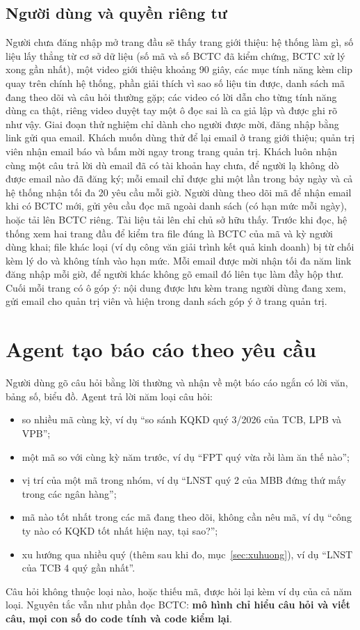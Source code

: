 \documentclass[12pt,a4paper]{report}
\newcommand{\enquote}[1]{“#1”}
\begin{document}
\subsection{Người dùng và quyền riêng tư}
Người chưa đăng nhập mở trang đầu sẽ thấy trang giới thiệu: hệ thống làm gì, số liệu lấy thẳng từ cơ sở dữ liệu (số mã
và số BCTC đã kiểm chứng, BCTC xử lý xong gần nhất), một video giới thiệu khoảng 90 giây, các mục tính năng kèm clip quay trên
chính hệ thống, phần giải thích vì sao số liệu tin được, danh sách mã đang theo dõi và câu hỏi thường gặp; các video có
lời dẫn cho từng tính năng dùng ca thật, riêng video duyệt tay một ô đọc sai là ca giả lập và được ghi rõ như vậy. Giai đoạn thử nghiệm chỉ dành cho người được mời, đăng nhập bằng link gửi qua email. Khách muốn
dùng thử để lại email ở trang giới thiệu; quản trị viên nhận email báo và bấm mời ngay trong trang quản trị. Khách luôn
nhận cùng một câu trả lời dù email đã có tài khoản hay chưa, để người lạ không dò được email nào đã đăng ký; mỗi email chỉ
được ghi một lần trong bảy ngày và cả hệ thống nhận tối đa 20 yêu cầu mỗi giờ. Người dùng theo dõi mã để nhận
email khi có BCTC mới, gửi yêu cầu đọc mã ngoài danh sách (có hạn mức mỗi ngày), hoặc tải lên BCTC riêng. Tài liệu tải
lên chỉ chủ sở hữu thấy. Trước khi đọc, hệ thống xem hai trang đầu để kiểm tra file đúng là BCTC của mã và kỳ người dùng
khai; file khác loại (ví dụ công văn giải trình kết quả kinh doanh) bị từ chối kèm lý do và không tính vào hạn mức.
Mỗi email được mời nhận tối đa năm link đăng nhập mỗi giờ, để người khác không gõ email đó liên tục làm đầy hộp thư.
Cuối mỗi trang có ô góp ý: nội dung được lưu kèm trang người dùng đang xem, gửi email cho quản trị viên và hiện trong
danh sách góp ý ở trang quản trị.

\section{Agent tạo báo cáo theo yêu cầu}\label{sec:agent}
Người dùng gõ câu hỏi bằng lời thường và nhận về một báo cáo ngắn có lời văn, bảng số, biểu đồ. Agent trả lời năm loại
câu hỏi:
\begin{itemize}
  \item so nhiều mã cùng kỳ, ví dụ \enquote{so sánh KQKD quý 3/2026 của TCB, LPB và VPB};
  \item một mã so với cùng kỳ năm trước, ví dụ \enquote{FPT quý vừa rồi làm ăn thế nào};
  \item vị trí của một mã trong nhóm, ví dụ \enquote{LNST quý 2 của MBB đứng thứ mấy trong các ngân hàng};
  \item mã nào tốt nhất trong các mã đang theo dõi, không cần nêu mã, ví dụ \enquote{công ty nào có KQKD tốt nhất hiện
        nay, tại sao?};
  \item xu hướng qua nhiều quý (thêm sau khi đo, mục~\ref{sec:xuhuong}), ví dụ \enquote{LNST của TCB 4 quý gần nhất}.
\end{itemize}
Câu hỏi không thuộc loại nào, hoặc thiếu mã, được hỏi lại kèm ví dụ của cả năm loại. Nguyên tắc vẫn như phần đọc BCTC:
\textbf{mô hình chỉ hiểu câu hỏi và viết câu, mọi con số do code tính và code kiểm lại}.
\end{document}

